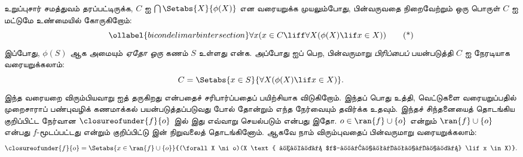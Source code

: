 \documentclass[../../../include/open-logic-section]{subfiles}
\begin{document}
உறுப்புசார் சமத்துவம் தரப்பட்டிருக்க, $C$ ஐ
$\bigcap\Setabs{X}{\phi(X)}$ என வரையறுக்க முயலும்போது, பின்வருவதை
நிறைவேற்றும் ஒரு பொருள் $C$ ஐ மட்டுமே உண்மையில் கோருகிறோம்:
\begin{equation}\ollabel{bicondelimarbintersection}
	\forall x(x \in C \liff \forall X(\phi(X) \lif x \in X))\tag{*}
\end{equation}
இப்போது, $\phi(S)$ ஆக அமையும் \emph{ஏதோ ஒரு} கணம் $S$ உள்ளது என்க.
அப்போது  ஐப் பெற, பின்வருமாறு
\emph{பிரிப்பைப்} பயன்படுத்தி $C$ ஐ நேரடியாக வரையறுக்கலாம்:
\[
	C = \Setabs{x \in S}{\forall X(\phi(X) \lif x \in X)}.
\]
இந்த வரையறை விரும்பியவாறு  ஐத் தருகிறது
என்பதைச் சரிபார்ப்பதைப் பயிற்சியாக விடுகிறோம்.
இந்தப் பொது உத்தி, வெட்டுகளை வரையறுப்பதில் முறைசாராப் பண்புவழிக்
கணமாக்கல் பயன்படுத்தப்படுவது போல் தோன்றும் எந்த நேர்வையும் தவிர்க்க
உதவும். இந்தச் சிந்தனையைத் தொடங்கிய குறிப்பிட்ட நேர்வான
$\closureofunder{f}{o}$ இல் இது எவ்வாறு செயல்படும் என்பது இதோ.
$o \in \ran{f}\cup\{o\}$ என்றும் $\ran{f} \cup \{o\}$ என்பது
$f$-மூடப்பட்டது என்றும் குறிப்பிட்டு
 இன் நிறுவலைத்
தொடங்கினோம். ஆகவே நாம் விரும்புவதைப் பின்வருமாறு வரையறுக்கலாம்:
\[
	\closureofunder{f}{o} = \Setabs{x \in \ran{f} \cup \{o\}}{(\forall X \ni o)(X \text{ ஆனது $f$-மூடப்பட்டது} \lif x \in X)}.
\]
\end{document}
